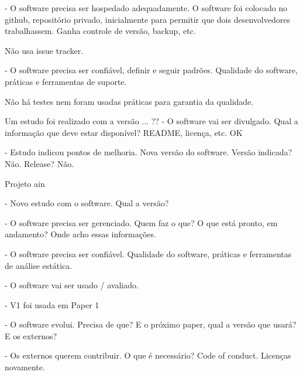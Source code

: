 - O software precisa ser hospedado adequadamente.
O software foi colocado no github, repositório privado, inicialmente para permitir que dois desenvolvedores trabalhassem. Ganha controle de versão, backup, etc. 

Não usa issue tracker.

- O software precisa ser confiável, definir e seguir padrões.
Qualidade do software, práticas e ferramentas de suporte.

Não há testes nem foram usadas práticas para garantia da qualidade.


Um estudo foi realizado com a versão ... ??
- O software vai ser divulgado.
Qual a informação que deve estar disponível? README, licença, etc. OK

- Estudo indicou pontos de melhoria.
Nova versão do software.
Versão indicada? Não. Release? Não.

Projeto ain

- Novo estudo com o software. Qual a versão?


- O software precisa ser gerenciado. Quem faz o que? O que está pronto, em andamento? Onde acho essas informações.

- O software precisa ser confiável.
Qualidade do software, práticas e ferramentas de análise estática.



- O software vai ser usado / avaliado.

- V1 foi usada em Paper 1

- O software evolui. Precisa de que? E o próximo paper, qual a versão que usará? E os externos?

- Os externos querem contribuir. O que é necessário?
Code of conduct. Licenças novamente.

